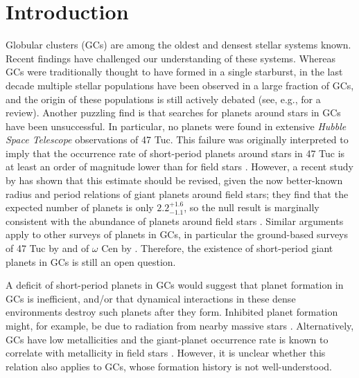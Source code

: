 \documentclass[iop,usenatbib]{emulateapj}
\begin{document}
\section{Introduction}
\label{sect:introduction}
Globular clusters (GCs) are among the oldest and densest stellar systems known. Recent findings have challenged our understanding of these systems. Whereas GCs were traditionally thought to have formed in a single starburst, in the last decade multiple stellar populations have been observed in a large fraction of GCs, and the origin of these populations is still actively debated (see, e.g., \citealt{2012A&ARv..20...50G} for a review). Another puzzling find is that searches for planets around stars in GCs have been unsuccessful. In particular, no planets were found in extensive {\it Hubble Space Telescope} observations of 47 Tuc. This failure was originally interpreted to imply that the occurrence rate of short-period planets around stars in 47 Tuc is at least an order of magnitude lower than for field stars \citep{2000ApJ...545L..47G}. However, a recent study by \citet{2017AJ....153..187M} has shown that this estimate should be revised, given the now better-known radius and period relations of giant planets around field stars; they find that the expected number of planets is only $2.2^{+1.6}_{-1.1}$, so the null result is marginally consistent with the abundance of planets around field stars \citep{2017AJ....153..187M}. Similar arguments apply to other surveys of planets in GCs, in particular the ground-based surveys of 47 Tuc by \citet{2005ApJ...620.1043W} and of $\omega$ Cen by \citet{2008ApJ...674.1117W}. Therefore, the existence of short-period giant planets in GCs is still an open question.

A deficit of short-period planets in GCs would suggest that planet formation in GCs is inefficient, and/or that dynamical interactions in these dense environments destroy such planets after they form. Inhibited planet formation might, for example, be due to radiation from nearby massive stars \citep{2000A&A...362..968A,2004ApJ...611..360A,2013MNRAS.431...63T}. Alternatively, GCs have low metallicities and the giant-planet occurrence rate is known to correlate with metallicity in field stars \citep{2001A&A...373.1019S,2005ApJ...622.1102F}. However, it is unclear whether this relation also applies to GCs, whose formation history is not well-understood.
\end{document}
